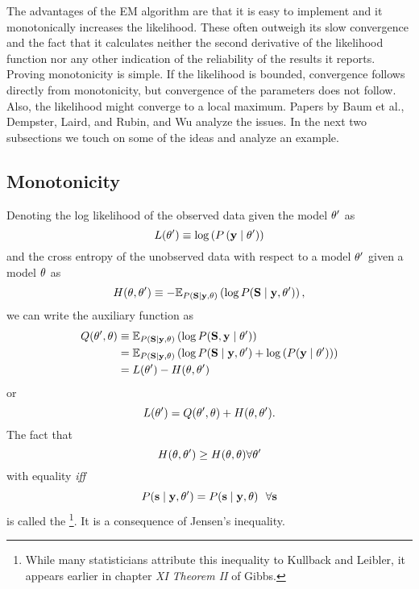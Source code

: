 The advantages of the EM algorithm are that it is easy to implement
and it monotonically increases the likelihood.  These often outweigh
its slow convergence and the fact that it calculates neither the
second derivative of the likelihood function nor any other indication
of the reliability of the results it reports.  Proving monotonicity is
simple.  If the likelihood is bounded, convergence follows directly
from monotonicity, but convergence of the parameters does not follow.
Also, the likelihood might converge to a local maximum.  Papers by
Baum et al.\cite{Baum70}, Dempster, Laird, and Rubin\cite{Dempster77},
and Wu\cite{Wu83} analyze the issues.  In the next two subsections we
touch on some of the ideas and analyze an example.

\subsection{Monotonicity}

Denoting the log likelihood of the observed data given the model
$\theta'$ as
\begin{equation*}
  L(\theta') \equiv \log \left( P \left(\mathbf{y}\mid \theta' \right)\right)
\end{equation*}
and the cross entropy of the unobserved data with respect to a model
$\theta'$ given a model $\theta$ as
\begin{equation*}
  H(\theta, \theta') \equiv - \mathbb{E}_{P
    \left({\bf S}\mid \mathbf{y},\theta \right)} \left( \log P({\bf S}\mid \mathbf{y},\theta')
  \right),
\end{equation*}
we can write the auxiliary function as
\begin{align*}
  Q(\theta',\theta) &\equiv \mathbb{E}_{P \left({\bf S}\mid \mathbf{y} ,\theta\right)}
  \left( \log P({\bf S},\mathbf{y}\mid \theta') \right)\\
  &= \mathbb{E}_{P \left({\bf S}\mid \mathbf{y} ,\theta \right)} \left( \log
    P({\bf S}\mid \mathbf{y},\theta') + \log \left( P(\mathbf{y}\mid \theta') \right)
  \right)\\
  &= L(\theta') - H(\theta, \theta')
\end{align*}
or
\begin{equation}
  \label{eq:LQH}
   L(\theta') = Q(\theta',\theta) + H(\theta,
   \theta').
\end{equation}
The fact that
\begin{equation}
  \label{eq:GibbsIE}
  H(\theta, \theta') \geq  H(\theta, \theta)
  \forall \theta'
\end{equation}
with equality \emph{iff}
\begin{equation*}
  P({\bf s}\mid \mathbf{y},\theta') =  P({\bf s}\mid \mathbf{y},\theta) ~~ \forall {\bf s}
\end{equation*}
is called the \emph{}\footnote{While many
  statisticians attribute this inequality to Kullback and
  Leibler\cite{Kullback51}, it appears earlier in chapter {\em XI}
  {\em Theorem II} of Gibbs\cite{Gibbs}.}.  It is a consequence of
 Jensen's inequality.

